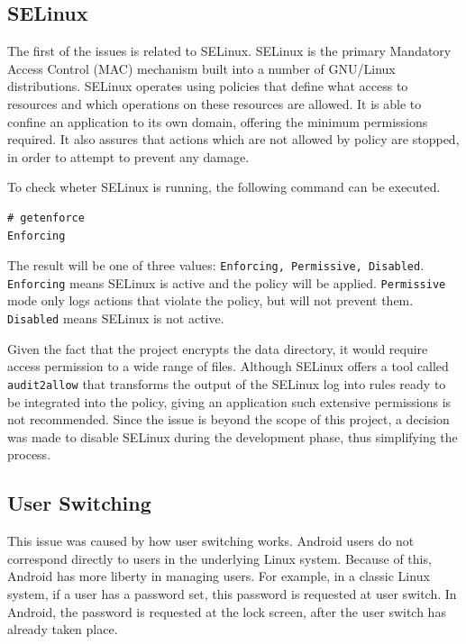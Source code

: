 \subsection{SELinux}
\label{sub-sec:selinux-multi-user}

The first of the issues is related to SELinux. SELinux is the primary Mandatory Access Control (MAC) mechanism built into a number of GNU/Linux distributions. SELinux operates using policies that define what access to resources and which operations on these resources are allowed. It is able to confine an application to its own domain, offering the minimum permissions required. It also assures that actions which are not allowed by policy are stopped, in order to attempt to prevent any damage.

To check wheter SELinux is running, the following command can be executed.
\begin{lstlisting}[numbers=none, caption=Checking SELinux status, label=lst:selinux-multi-user]
# getenforce
Enforcing
\end{lstlisting}
The result will be one of three values: \texttt{Enforcing, Permissive, Disabled}. \texttt{Enforcing} means SELinux is active and the policy will be applied. \texttt{Permissive} mode only logs actions that violate the policy, but will not prevent them. \texttt{Disabled} means SELinux is not active.

Given the fact that the project encrypts the data directory, it would require access permission to a wide range of files. Although SELinux offers a tool called \texttt{audit2allow} that transforms the output of the SELinux log into rules ready to be integrated into the policy, giving an application such extensive permissions is not recommended. Since the issue is beyond the scope of this project, a decision was made to disable SELinux during the development phase, thus simplifying the process.

\subsection{User Switching}
\label{sub-sec:user-switch-multi-user}

This issue was caused by how user switching works. Android users do not correspond directly to users in the underlying Linux system. Because of this, Android has more liberty in managing users. For example, in a classic Linux system, if a user has a password set, this password is requested at user switch. In Android, the password is requested at the lock screen, after the user switch has already taken place.

